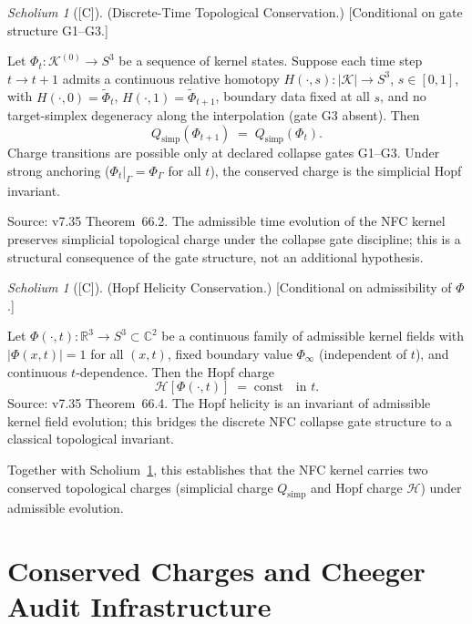 \documentclass[12pt,oneside]{amsbook}
\theoremstyle{plain}
\theoremstyle{definition}
\theoremstyle{remark}
\newtheorem{scholium}[theorem]{Scholium}
\newcommand{\status}[1]{\textup{[#1]}}
\begin{document}
\begin{scholium}[\status{C}]\label{sch:topological-conservation}
\textup{(Discrete-Time Topological Conservation.)}
\textup{[Conditional on gate structure G1--G3.]}

Let $\Phi_t : \mathcal{K}^{(0)} \to S^3$ be a sequence of kernel
states.  Suppose each time step $t \to t+1$ admits a continuous
relative homotopy $H(\cdot, s) : |\mathcal{K}| \to S^3$,
$s \in [0,1]$, with $H(\cdot,0) = \widetilde\Phi_t$,
$H(\cdot,1) = \widetilde\Phi_{t+1}$, boundary data fixed at all $s$,
and no target-simplex degeneracy along the interpolation (gate G3
absent).  Then
\[
  Q_{\mathrm{simp}}(\Phi_{t+1}) \;=\; Q_{\mathrm{simp}}(\Phi_t).
\]
Charge transitions are possible only at declared collapse gates
G1--G3.  Under strong anchoring ($\Phi_t|_\Gamma = \Phi_\Gamma$ for
all $t$), the conserved charge is the simplicial Hopf invariant.

Source: v7.35 Theorem~66.2.  The admissible time evolution of the
NFC kernel preserves simplicial topological charge under the collapse
gate discipline; this is a structural consequence of the gate
structure, not an additional hypothesis.
\end{scholium}

\begin{scholium}[\status{C}]\label{sch:hopf-helicity}
\textup{(Hopf Helicity Conservation.)}
\textup{[Conditional on admissibility of $\Phi$.]}

Let $\Phi(\cdot,t) : \mathbb{R}^3 \to S^3 \subset \mathbb{C}^2$ be a
continuous family of admissible kernel fields with $|\Phi(x,t)| = 1$
for all $(x,t)$, fixed boundary value $\Phi_\infty$ (independent of
$t$), and continuous $t$-dependence.  Then the Hopf charge
\[
  \mathcal{H}[\Phi(\cdot,t)] \;=\; \mathrm{const}
  \quad \text{in } t.
\]
Source: v7.35 Theorem~66.4.  The Hopf helicity is an invariant of
admissible kernel field evolution; this bridges the discrete NFC
collapse gate structure to a classical topological invariant.

Together with Scholium~\ref{sch:topological-conservation}, this
establishes that the NFC kernel carries two conserved topological
charges (simplicial charge $Q_{\mathrm{simp}}$ and Hopf charge
$\mathcal{H}$) under admissible evolution.
\end{scholium}

\section{Conserved Charges and Cheeger Audit Infrastructure}
\label{sec:charges-cheeger}
\end{document}
